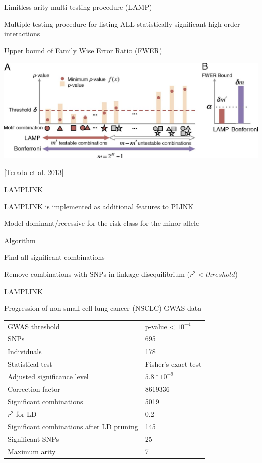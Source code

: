 \documentclass[ignorenonframetext,]{beamer}
\begin{document}
\begin{frame}{Limitless arity multi-testing procedure (LAMP)}

Multiple testing procedure for listing ALL statistically significant
high order interactions

\pause

Upper bound of Family Wise Error Ratio (FWER)

\includegraphics{images/F2.large.jpg}

{[}Terada et al. 2013{]}

\end{frame}

\begin{frame}{LAMPLINK}

LAMPLINK is implemented as additional features to PLINK

\pause

Model dominant/recessive for the risk class for the minor allele

\pause

\begin{block}{Algorithm}

Find all significant combinations

\pause

Remove combinations with SNPs in linkage disequilibrium
(\(r^2 < threshold\))

\end{block}

\end{frame}

\begin{frame}{LAMPLINK}

\begin{block}{Progression of non-small cell lung cancer (NSCLC) GWAS
data}

\begin{longtable}[]{@{}ll@{}}
\toprule
GWAS threshold & p-value \textless{} \(10^{-4}\)\tabularnewline
SNPs & 695\tabularnewline
Individuals & 178\tabularnewline
Statistical test & Fisher's exact test\tabularnewline
Adjusted significance level & \(5.8*10^{-9}\)\tabularnewline
Correction factor & 8619336\tabularnewline
Significant combinations & 5019\tabularnewline
\(r^2\) for LD & 0.2\tabularnewline
Significant combinations after LD pruning & 145\tabularnewline
Significant SNPs & 25\tabularnewline
Maximum arity & 7\tabularnewline
\bottomrule
\end{longtable}

\end{block}

\end{frame}
\end{document}
